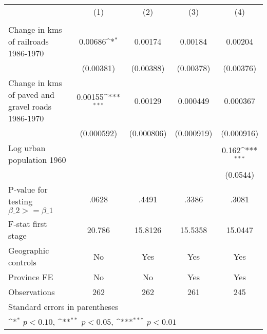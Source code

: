 {
\def\sym#1{\ifmmode^{#1}\else\(^{#1}\)\fi}
\begin{tabular}{l*{4}{c}}
\hline\hline
                &\multicolumn{1}{c}{(1)}&\multicolumn{1}{c}{(2)}&\multicolumn{1}{c}{(3)}&\multicolumn{1}{c}{(4)}\\
                &\multicolumn{1}{c}{}&\multicolumn{1}{c}{}&\multicolumn{1}{c}{}&\multicolumn{1}{c}{}\\
\hline
Change in kms of railroads 1986-1970&  0.00686\sym{*}  &  0.00174         &  0.00184         &  0.00204         \\
                &(0.00381)         &(0.00388)         &(0.00378)         &(0.00376)         \\
[1em]
Change in kms of paved and gravel roads 1986-1970&  0.00155\sym{***}&  0.00129         & 0.000449         & 0.000367         \\
                &(0.000592)         &(0.000806)         &(0.000919)         &(0.000916)         \\
[1em]
Log urban population 1960&                  &                  &                  &    0.162\sym{***}\\
                &                  &                  &                  & (0.0544)         \\
\hline
P-value for testing $\beta\_{2} >= \beta\_{1}$&    .0628         &    .4491         &    .3386         &    .3081         \\
F-stat first stage&   20.786         &  15.8126         &  15.5358         &  15.0447         \\
Geographic controls&       No         &      Yes         &      Yes         &      Yes         \\
Province FE     &       No         &       No         &      Yes         &      Yes         \\
Observations    &      262         &      262         &      261         &      245         \\
\hline\hline
\multicolumn{5}{l}{\footnotesize Standard errors in parentheses}\\
\multicolumn{5}{l}{\footnotesize \sym{*} \(p<0.10\), \sym{**} \(p<0.05\), \sym{***} \(p<0.01\)}\\
\end{tabular}
}
